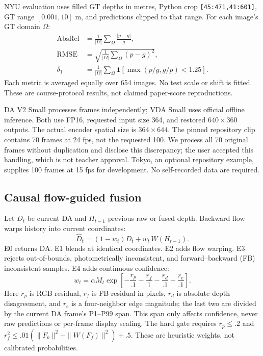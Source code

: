 \documentclass[10pt,twocolumn,letterpaper]{article}
\begin{document}
NYU evaluation uses filled GT depths in metres, Python crop \texttt{[45:471,41:601]}, GT range $[0.001,10]$ m, and predictions clipped to that range. For each image's GT domain $\Omega$:
\begin{align}
\mathrm{AbsRel}&=\frac{1}{|\Omega|}\sum_{\Omega}\frac{|p-g|}{g},\\
\mathrm{RMSE}&=\sqrt{\frac{1}{|\Omega|}\sum_{\Omega}(p-g)^2},\\
\delta_1&=\frac{1}{|\Omega|}\sum_{\Omega}
\mathbf{1}\!\left[\max(p/g,g/p)<1.25\right].
\end{align}
Each metric is averaged equally over 654 images. No test scale or shift is fitted. These are course-protocol results, not claimed paper-score reproductions.

DA V2 Small processes frames independently; VDA Small uses official offline inference. Both use FP16, requested input size 364, and restored $640\times360$ outputs. The actual encoder spatial size is $364\times644$. The pinned repository clip contains 70 frames at 24 fps, not the requested 100. We process all 70 original frames without duplication and disclose this discrepancy; the user accepted this handling, which is not teacher approval. Tokyo, an optional repository example, supplies 100 frames at 15 fps for development. No self-recorded data are required.

\subsection{Causal flow-guided fusion}
Let $D_t$ be current DA and $H_{t-1}$ previous raw or fused depth. Backward flow warps history into current coordinates:
\begin{equation}
\widehat D_t=(1-w_t)D_t+w_t\,W(H_{t-1}).
\end{equation}
E0 returns DA. E1 blends at identical coordinates. E2 adds flow warping. E3 rejects out-of-bounds, photometrically inconsistent, and forward--backward (FB) inconsistent samples. E4 adds continuous confidence:
\begin{equation}
w_t=\alpha M_t\exp\!\left[-\frac{r_p}{.1}-\frac{r_f}{1}
-\frac{r_d}{.1}-\frac{r_e}{.1}\right].
\label{eq:confidence}
\end{equation}
Here $r_p$ is RGB residual, $r_f$ is FB residual in pixels, $r_d$ is absolute depth disagreement, and $r_e$ is a four-neighbor edge magnitude; the last two are divided by the current DA frame's P1--P99 span. This span only affects confidence, never raw predictions or per-frame display scaling. The hard gate requires $r_p\le.2$ and $r_f^2\le.01(\|F_b\|^2+\|W(F_f)\|^2)+.5$. These are heuristic weights, not calibrated probabilities.
\end{document}
